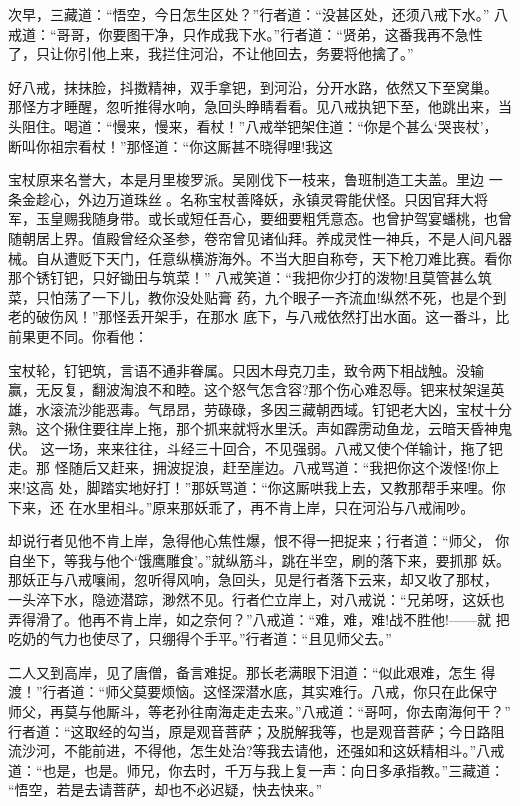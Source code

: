 次早，三藏道：“悟空，今日怎生区处？”行者道：“没甚区处，还须八戒下水。”
八戒道：“哥哥，你要图干净，只作成我下水。”行者道：“贤弟，这番我再不急性
了，只让你引他上来，我拦住河沿，不让他回去，务要将他擒了。”

好八戒，抹抹脸，抖擞精神，双手拿钯，到河沿，分开水路，依然又下至窝巢。
那怪方才睡醒，忽听推得水响，急回头睁睛看看。见八戒执钯下至，他跳出来，当
头阻住。喝道：“慢来，慢来，看杖！”八戒举钯架住道：“你是个甚么‘哭丧杖’，
断叫你祖宗看杖！”那怪道：“你这厮甚不晓得哩!我这

宝杖原来名誉大，本是月里梭罗派。吴刚伐下一枝来，鲁班制造工夫盖。里边
一条金趁心，外边万道珠丝。名称宝杖善降妖，永镇灵霄能伏怪。只因官拜大将
军，玉皇赐我随身带。或长或短任吾心，要细要粗凭意态。也曾护驾宴蟠桃，也曾
随朝居上界。值殿曾经众圣参，卷帘曾见诸仙拜。养成灵性一神兵，不是人间凡器
械。自从遭贬下天门，任意纵横游海外。不当大胆自称夸，天下枪刀难比赛。看你
那个锈钉钯，只好锄田与筑菜！”
八戒笑道：“我把你少打的泼物!且莫管甚么筑菜，只怕荡了一下儿，教你没处贴膏
药，九个眼子一齐流血!纵然不死，也是个到老的破伤风！”那怪丢开架手，在那水
底下，与八戒依然打出水面。这一番斗，比前果更不同。你看他：

宝杖轮，钉钯筑，言语不通非眷属。只因木母克刀圭，致令两下相战触。没输
赢，无反复，翻波淘浪不和睦。这个怒气怎含容?那个伤心难忍辱。钯来杖架逞英
雄，水滚流沙能恶毒。气昂昂，劳碌碌，多因三藏朝西域。钉钯老大凶，宝杖十分
熟。这个揪住要往岸上拖，那个抓来就将水里沃。声如霹雳动鱼龙，云暗天昏神鬼
伏。
这一场，来来往往，斗经三十回合，不见强弱。八戒又使个佯输计，拖了钯走。那
怪随后又赶来，拥波捉浪，赶至崖边。八戒骂道：“我把你这个泼怪!你上来!这高
处，脚踏实地好打！”那妖骂道：“你这厮哄我上去，又教那帮手来哩。你下来，还
在水里相斗。”原来那妖乖了，再不肯上岸，只在河沿与八戒闹吵。

却说行者见他不肯上岸，急得他心焦性爆，恨不得一把捉来；行者道：“师父，
你自坐下，等我与他个‘饿鹰雕食’。”就纵筋斗，跳在半空，刷的落下来，要抓那
妖。那妖正与八戒嚷闹，忽听得风响，急回头，见是行者落下云来，却又收了那杖，
一头淬下水，隐迹潜踪，渺然不见。行者伫立岸上，对八戒说：“兄弟呀，这妖也
弄得滑了。他再不肯上岸，如之奈何？”八戒道：“难，难，难!战不胜他!——就
把吃奶的气力也使尽了，只绷得个手平。”行者道：“且见师父去。”

二人又到高岸，见了唐僧，备言难捉。那长老满眼下泪道：“似此艰难，怎生
得渡！”行者道：“师父莫要烦恼。这怪深潜水底，其实难行。八戒，你只在此保守
师父，再莫与他厮斗，等老孙往南海走走去来。”八戒道：“哥呵，你去南海何干？”
行者道：“这取经的勾当，原是观音菩萨；及脱解我等，也是观音菩萨；今日路阻
流沙河，不能前进，不得他，怎生处治?等我去请他，还强如和这妖精相斗。”八戒
道：“也是，也是。师兄，你去时，千万与我上复一声：向日多承指教。”三藏道：
“悟空，若是去请菩萨，却也不必迟疑，快去快来。”

